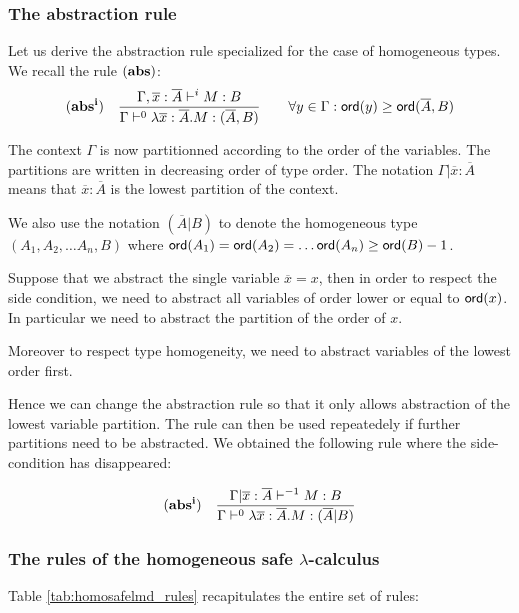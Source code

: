 \subsubsection{The abstraction rule}

Let us derive the abstraction rule specialized for the case of
homogeneous types. We recall the rule $\mathbf{(abs)}$:
$$ \mathbf{(abs^i)} \quad  \frac{\displaystyle \Gamma, \overline{x} : \overline{A} \vdash^{i} M : B}{\Gamma  \vdash^{0} \lambda \overline{x} : \overline{A} . M : (\overline{A},B)} \qquad
                                   \forall y \in \Gamma : {\sf ord}(y) \geq {\sf ord}(\overline{A},B)$$

The context $\Gamma$ is now partitionned according to the order of
the variables. The partitions are written in decreasing order of
type order. The notation $\Gamma | \overline{x}:\overline{A}$ means
that $\overline{x}:\overline{A}$ is the lowest partition of the
context.

We also use the notation $(\overline{A}|B)$ to denote the
homogeneous type $(A_1, A_2, \ldots A_n, B)$ where ${\sf ord}(A_1) =
{\sf ord}(A_2) =  \ldots {\sf ord}(A_n) \geq {\sf ord}(B) -1$.


Suppose that we abstract the single variable $\overline{x} = x$,
then in order to respect the side condition, we need to abstract all
variables of order lower or equal to ${\sf ord}(x)$. In particular we
need to abstract the partition of the order of $x$.

Moreover to respect type homogeneity, we need to abstract variables
of the lowest order first.

Hence we can change the abstraction rule so that it only allows
abstraction of the lowest variable partition. The rule can then be
used repeatedely if further partitions need to be abstracted. We
obtained the following rule where the side-condition has
disappeared:

$$ \mathbf{(abs^i)} \quad  \frac{\displaystyle \Gamma| \overline{x} : \overline{A} \vdash^{-1} M : B}{\Gamma  \vdash^{0} \lambda \overline{x} : \overline{A} . M : (\overline{A}|B)}$$


\subsubsection{The rules of the homogeneous safe $\lambda$-calculus}

Table \ref{tab:homosafelmd_rules} recapitulates the entire set of rules:

